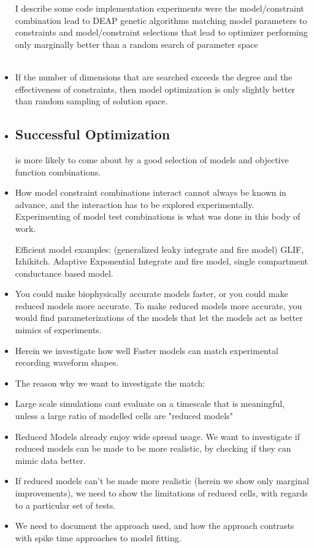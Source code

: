 \documentclass{article}
\begin{document}
\begin{itemize}
I describe some code implementation experiments were the model/constraint combination lead to DEAP genetic algorithms matching model parameters to constraints and model/constraint selections that lead to optimizer performing only marginally better than a random search of parameter space\\
\\
\item If the number of dimensions that are searched exceeds the degree and the effectiveness of constraints, then model optimization is only slightly better than random sampling of solution space.

\item \subsection{Successful Optimization} is more likely to come about by a good selection of models and objective function combinations. 
\item How model constraint combinations interact cannot always be known in advance, and the interaction has to be explored experimentally. Experimenting of model test combinations is what was done in this body of work.

Efficient model examples: (generalized leaky integrate and fire model) GLIF, Izhikitch. Adaptive Exponential Integrate and fire model, single compartment conductance based model. 

\item You could make biophysically accurate models faster, or you could make reduced models more accurate. To make reduced models more accurate, you would find parameterizations of the models that let the models act as better mimics of experiments.
\item Herein we investigate how well Faster models can match experimental recording waveform shapes.
\item The reason why we want to investigate the match:
\item Large scale simulations cant evaluate on a timescale that is meaningful, unless a large ratio of modelled cells are "reduced models"
\item Reduced Models already enjoy wide spread usage. We want to investigate if reduced models can be made to be more realistic, by checking if they can mimic data better.
\item If reduced models can't be made more realistic (herein we show only marginal improvements), we need to show the limitations of reduced cells, with regards to a particular set of tests.
\item We need to document the approach used, and how the approach contrasts with spike time approaches to model fitting.
\end{itemize}
\end{document}
